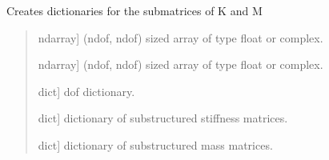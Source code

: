 \documentclass[letterpaper,10pt,english]{sphinxmanual}
\begin{document}
\begin{fulllineitems}
\label{\detokenize{core:pywfe.core.model_setup.substructure_matrices}}
\pysigstartsignatures
{}
\pysigstopsignatures
\sphinxAtStartPar
Creates dictionaries for the submatrices of K and M
\begin{quote}\begin{description}
\begin{description}
\sphinxlineitem{\sphinxstylestrong{K}}{[}ndarray{]}
\sphinxAtStartPar
(ndof, ndof) sized array of type float or complex.

\sphinxlineitem{\sphinxstylestrong{M}}{[}ndarray{]}
\sphinxAtStartPar
(ndof, ndof) sized array of type float or complex.

\sphinxlineitem{\sphinxstylestrong{dof}}{[}dict{]}
\sphinxAtStartPar
dof dictionary.

\end{description}

\begin{description}
\sphinxlineitem{\sphinxstylestrong{K\_sub}}{[}dict{]}
\sphinxAtStartPar
dictionary of substructured stiffness matrices.

\sphinxlineitem{\sphinxstylestrong{M\_sub}}{[}dict{]}
\sphinxAtStartPar
dictionary of substructured mass matrices.

\end{description}

\end{description}\end{quote}

\end{fulllineitems}

\end{document}
